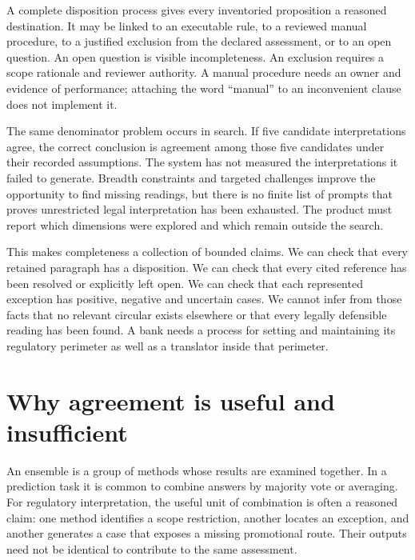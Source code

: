 \documentclass[12pt,a4paper,oneside,openany]{book}
\begin{document}
A complete disposition process gives every inventoried proposition a reasoned
destination. It may be linked to an executable rule, to a reviewed manual
procedure, to a justified exclusion from the declared assessment, or to an open
question. An open question is visible incompleteness. An exclusion requires a
scope rationale and reviewer authority. A manual procedure needs an owner and
evidence of performance; attaching the word ``manual'' to an inconvenient clause
does not implement it.

The same denominator problem occurs in search. If five candidate interpretations
agree, the correct conclusion is agreement among those five candidates under
their recorded assumptions. The system has not measured the interpretations it
failed to generate. Breadth constraints and targeted challenges improve the
opportunity to find missing readings, but there is no finite list of prompts
that proves unrestricted legal interpretation has been exhausted. The product
must report which dimensions were explored and which remain outside the search.

This makes completeness a collection of bounded claims. We can check that every
retained paragraph has a disposition. We can check that every cited reference has
been resolved or explicitly left open. We can check that each represented
exception has positive, negative and uncertain cases. We cannot infer from those
facts that no relevant circular exists elsewhere or that every legally
defensible reading has been found. A bank needs a process for setting and
maintaining its regulatory perimeter as well as a translator inside that perimeter.

\section{Why agreement is useful and insufficient}
\label{merge:M01:04}

\label{sec:problem-agreement}
An ensemble is a group of methods whose results are examined together. In a
prediction task it is common to combine answers by majority vote or averaging.
For regulatory interpretation, the useful unit of combination is often a
reasoned claim: one method identifies a scope restriction, another locates an
exception, and another generates a case that exposes a missing promotional route.
Their outputs need not be identical to contribute to the same assessment.
\end{document}
